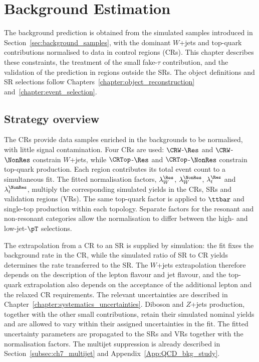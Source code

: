 \chapter{Background Estimation}
\label{chapter:background_estimation}

The background prediction is obtained from the simulated samples introduced in Section~\ref{sec:background_samples}, with the dominant $W$+jets and top-quark contributions normalised to data in control regions (CRs).
This chapter describes these constraints, the treatment of the small fake-$\tau$ contribution, and the validation of the prediction in regions outside the SRs.
The object definitions and SR selections follow Chapters~\ref{chapter:object_reconstruction} and~\ref{chapter:event_selection}.

\section{Strategy overview}
\label{sec:ch8_strategy}

The CRs provide data samples enriched in the backgrounds to be normalised, with little signal contamination.
Four CRs are used: $\CRW$-$\Res$ and $\CRW$-$\NonRes$ constrain $W$+jets, while $\CRTop$-$\Res$ and $\CRTop$-$\NonRes$ constrain top-quark production.
Each region contributes its total event count to a simultaneous fit.
The fitted normalisation factors, $\lambda_W^{\Res}$, $\lambda_W^{\NonRes}$, $\lambda_t^{\Res}$ and $\lambda_t^{\NonRes}$, multiply the corresponding simulated yields in the CRs, SRs and validation regions (VRs).
The same top-quark factor is applied to $\ttbar$ and single-top production within each topology.
Separate factors for the resonant and non-resonant categories allow the normalisation to differ between the high- and low-jet-$\pT$ selections.

The extrapolation from a CR to an SR is supplied by simulation: the fit fixes the background rate in the CR, while the simulated ratio of SR to CR yields determines the rate transferred to the SR.
The $W$+jets extrapolation therefore depends on the description of the lepton flavour and jet flavour, and the top-quark extrapolation also depends on the acceptance of the additional lepton and the relaxed CR requirements.
The relevant uncertainties are described in Chapter~\ref{chapter:systematics_uncertainties}.
Diboson and $Z$+jets production, together with the other small contributions, retain their simulated nominal yields and are allowed to vary within their assigned uncertainties in the fit.
The fitted uncertainty parameters are propagated to the SRs and VRs together with the normalisation factors.
The multijet suppression is already described in Section~\ref{subsec:ch7_multijet} and Appendix~\ref{App:QCD_bkg_study}.

